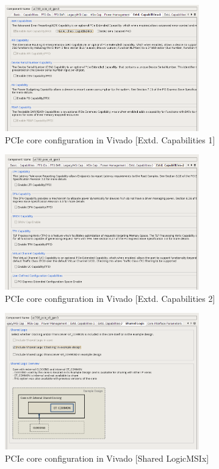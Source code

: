 \begin{figure}[H]
\centering
\includegraphics[width=0.75\textwidth]{figures/pcie_core_extcapa1.png}
\caption{PCIe core configuration in Vivado [Extd. Capabilities 1]}
\label{fig:pcie_core_config8}
\end{figure}

\newpage

\begin{figure}[H]
\centering
\includegraphics[width=0.75\textwidth]{figures/pcie_core_extcapa2.png}
\caption{PCIe core configuration in Vivado [Extd. Capabilities 2]}
\label{fig:pcie_core_config9}
\end{figure}


\begin{figure}[H]
\centering
\includegraphics[width=0.75\textwidth]{figures/pcie_core_shared.png}
\caption{PCIe core configuration in Vivado [Shared LogicMSIx]}
\label{fig:pcie_core_config10}
\end{figure}

